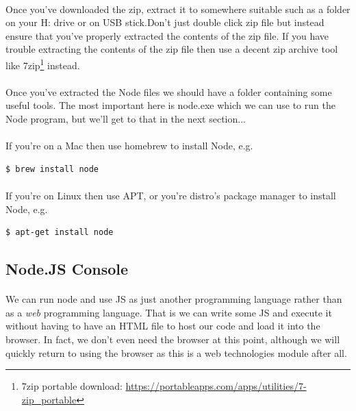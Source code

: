 \documentclass[10pt, a4paper, twosize]{article}
\begin{document}
\paragraph{} Once you've downloaded the zip, extract it to somewhere suitable such as a folder on your H: drive or on USB stick.Don't just double click zip file but instead ensure that you've properly extracted the contents of the zip file. If you have trouble extracting the contents of the zip file then use a decent zip archive tool like 7zip\footnote{7zip portable download: \url{https://portableapps.com/apps/utilities/7-zip_portable}} instead.

\paragraph{} Once you've extracted the Node files we should have a folder containing some useful tools. The most important here is node.exe which we can use to run the Node program, but we'll get to that in the next section...

\paragraph{} If you're on a Mac then use homebrew to install Node, e.g.

\begin{lstlisting}[style=DOS]
$ brew install node
\end{lstlisting}

\paragraph{} If you're on Linux then use APT, or you're distro's package manager to install Node, e.g.

\begin{lstlisting}[style=DOS]
$ apt-get install node
\end{lstlisting}


\subsection{Node.JS Console}
\paragraph{} We can run node and use JS as just another programming language rather than as a \emph{web} programming language. That is we can write some JS and execute it without having to have an HTML file to host our code and load it into the browser. In fact, we don't even need the browser at this point, although we will quickly return to using the browser as this is a web technologies module after all.
\end{document}
